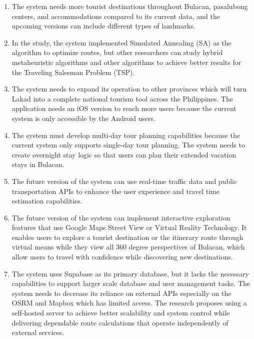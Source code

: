 \begin{enumerate}
	\item The system needs more tourist destinations throughout Bulacan, pasalubong centers, and accommodations compared to its current data, and the  upcoming versions can include different types of landmarks. 

	\item In the study, the system implemented Simulated Annealing (SA) as the algorithm to optimize routes, but other researchers can study hybrid metaheuristic algorithms and other algorithms to achieve better results for the Traveling Salesman Problem (TSP).

	\item The system needs to expand its operation to other provinces which will turn Lakad into a complete national tourism tool across the Philippines. The application needs an iOS version to reach more users because the current system is only accessible by the Android users.

	\item The system must develop multi-day tour planning capabilities because the current system only supports single-day tour planning. The system needs to create overnight stay logic so that users can plan their extended vacation stays in Bulacan.

	\item The future version of the system can use real-time traffic data and public transportation APIs to enhance the user experience and travel time estimation capabilities.

	\item The future version of the system can implement interactive exploration features that use Google Maps Street View or Virtual Reality Technology. It enables users to explore a tourist destination or the itinerary route through virtual means while they view all 360 degree perspectives of Bulacan, which allow users to travel with confidence while discovering new destinations.

	\item The system uses Supabase as its primary database, but it lacks the necessary capabilities to support larger scale database and user management tasks. The system needs to decrease its reliance on external APIs especially on the OSRM and Mapbox which has limited access.  The research proposes using a self-hosted server to achieve better scalability and system control while delivering dependable route calculations that operate independently of external services.
\end{enumerate}
